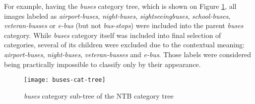     For example, having the \textit{buses} category tree, which is shown on Figure \ref{fig:buses-cat-tree}, all images labeled as \textit{airport-buses}, \textit{night-buses}, \textit{sightseeingbuses}, \textit{school-buses}, \textit{veteran-busses} or \textit{e-bus} (but not \textit{bus-stops}) were included into the parent \textit{buses} category. While \textit{buses} category itself was included into final selection of categories, several of its children were excluded due to the contextual meaning: \textit{airport-buses}, \textit{night-buses}, \textit{veteran-busses} and \textit{e-bus}. Those labels were considered being practically impossible to classify only by their appearance.
    
    \begin{figure}[h!]
        \centering
        \texttt{[image: buses-cat-tree]}
        \caption{\textit{buses} category sub-tree of the NTB category tree}
        \label{fig:buses-cat-tree}
    \end{figure}
    
    
    
    
    
    
    
